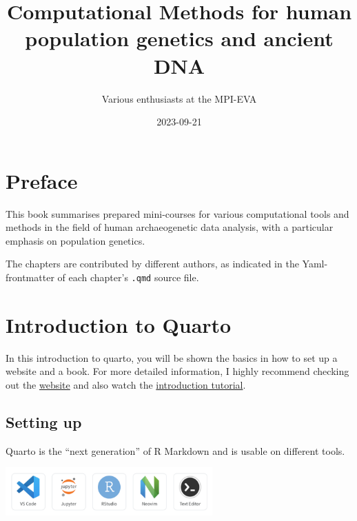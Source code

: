 \documentclass[
  letterpaper,
  DIV=11,
  numbers=noendperiod]{scrreprt}
\title{Computational Methods for human population genetics and ancient
DNA}
\author{Various enthusiasts at the MPI-EVA}
\date{2023-09-21}
\renewcommand*\contentsname{Table of contents}
\newcommand\contentsname{Table of contents}
\begin{document}
\maketitle
\ifdefined\Shaded\renewenvironment{Shaded}{\begin{tcolorbox}[sharp corners, enhanced, boxrule=0pt, interior hidden, borderline west={3pt}{0pt}{shadecolor}, frame hidden, breakable]}{\end{tcolorbox}}\fi

\renewcommand*\contentsname{Table of contents}
{
\hypersetup{linkcolor=}
\setcounter{tocdepth}{2}
\tableofcontents
}

\hypertarget{preface}{%
\chapter*{Preface}\label{preface}}


This book summarises prepared mini-courses for various computational
tools and methods in the field of human archaeogenetic data analysis,
with a particular emphasis on population genetics.

The chapters are contributed by different authors, as indicated in the
Yaml-frontmatter of each chapter's \texttt{.qmd} source file.


\hypertarget{introduction-to-quarto}{%
\chapter{Introduction to Quarto}\label{introduction-to-quarto}}

In this introduction to quarto, you will be shown the basics in how to
set up a website and a book. For more detailed information, I highly
recommend checking out the \href{https://quarto.org}{website} and also
watch the \href{https://youtu.be/_f3latmOhew}{introduction tutorial}.

\hypertarget{setting-up}{%
\section{Setting up}\label{setting-up}}

Quarto is the ``next generation'' of R Markdown and is usable on
different tools.

\includegraphics[width=3.125in,height=\textheight]{img/quarto_intro/Picture 1.png}
\end{document}
